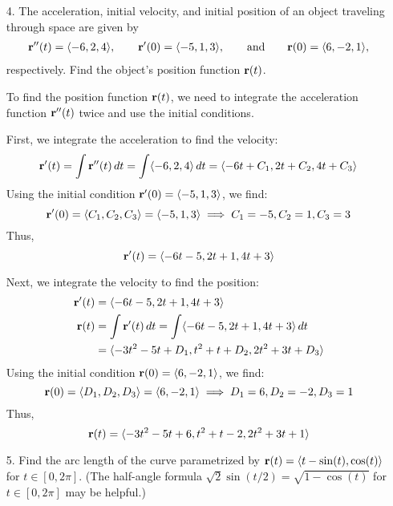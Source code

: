 \documentclass[reqno, 12pt]{amsart}
\begin{document}
\begin{itemize}
\begin{answerbox}
    \end{answerbox}
    \vspace{0.5 in}

  \item[4.] The acceleration, initial velocity, and initial position of an object traveling through space are given by
    \begin{align*}
      {\bf r}''(t) = \langle -6,2,4\rangle, \quad\quad {\bf r}'(0) = \langle -5,1,3\rangle, \quad\quad\text{and}\quad\quad {\bf r}(0) = \langle 6,-2,1\rangle,
    \end{align*}
    respectively. Find the object's position function ${\bf r}(t)$.
    \newline

    \begin{answerbox}
      To find the position function \( {\bf r}(t) \), we need to integrate the acceleration function \( {\bf r}''(t) \) twice and use the initial conditions.

      First, we integrate the acceleration to find the velocity:
      \[
        {\bf r}'(t) = \int {\bf r}''(t) \, dt = \int \langle -6, 2, 4 \rangle \, dt = \langle -6t + C_1, 2t + C_2, 4t + C_3 \rangle
      \]
      Using the initial condition \( {\bf r}'(0) = \langle -5, 1, 3 \rangle \), we find:
      \[
        {\bf r}'(0) = \langle C_1, C_2, C_3 \rangle = \langle -5, 1, 3 \rangle \implies C_1 = -5, C_2 = 1, C_3 = 3
      \]
      Thus,
      \[
        {\bf r}'(t) = \langle -6t - 5, 2t + 1, 4t + 3 \rangle
      \]

      Next, we integrate the velocity to find the position:
      \begin{align*}
        {\bf r}'(t) &= \langle -6t - 5, 2t + 1, 4t + 3 \rangle \\
        {\bf r}(t) &= \int {\bf r}'(t) \, dt = \int \langle -6t - 5, 2t + 1, 4t + 3 \rangle \, dt \\
        &= \langle -3t^2 - 5t + D_1, t^2 + t + D_2, 2t^2 + 3t + D_3 \rangle
      \end{align*}
      Using the initial condition \( {\bf r}(0) = \langle 6, -2, 1 \rangle \), we find:
      \[
        {\bf r}(0) = \langle D_1, D_2, D_3 \rangle = \langle 6, -2, 1 \rangle \implies D_1 = 6, D_2 = -2, D_3 = 1
      \]
      Thus,
      \[
        {\bf r}(t) = \langle -3t^2 - 5t + 6, t^2 + t - 2, 2t^2 + 3t + 1 \rangle
      \]
    \end{answerbox}
    \vspace{0.5 in}

  \item[5.] Find the arc length of the curve parametrized by ${\bf r}(t) = \langle t-\sin(t), \cos(t)\rangle$ for $t \in [0,2\pi]$. (The half-angle formula $\sqrt{2}\sin(t/2) = \sqrt{1-\cos(t)}$ for $t \in [0,2\pi]$ may be helpful.)
    \newline


\end{itemize}
\end{document}
